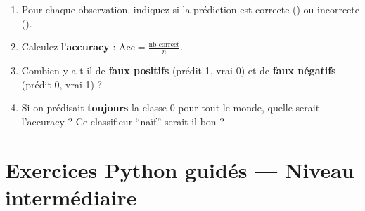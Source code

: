 \begin{enumerate}[label=\alph*)]
    \item Pour chaque observation, indiquez si la pr\'{e}diction est correcte
        (\checkmark) ou incorrecte (\texttimes).

    \item Calculez l'\textbf{accuracy} : $\text{Acc} = \frac{\text{nb correct}}{n}$.

    \item Combien y a-t-il de \textbf{faux positifs} (pr\'{e}dit 1, vrai 0)
        et de \textbf{faux n\'{e}gatifs} (pr\'{e}dit 0, vrai 1) ?

    \item Si on pr\'{e}disait \textbf{toujours} la classe 0 pour tout le monde,
        quelle serait l'accuracy ? Ce classifieur ``na\"{i}f'' serait-il bon ?
\end{enumerate}

\section*{Exercices Python guid\'{e}s --- Niveau interm\'{e}diaire}


